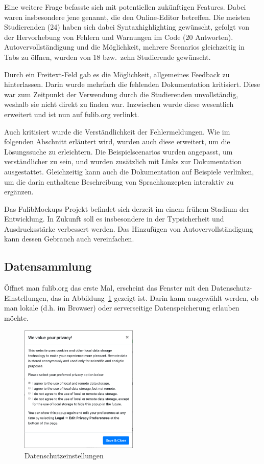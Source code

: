 Eine weitere Frage befasste sich mit potentiellen zukünftigen Features.
Dabei waren insbesondere jene genannt, die den Online-Editor betreffen.
Die meisten Studierenden (24) haben sich dabei Syntaxhighlighting gewünscht,
gefolgt von der Hervorhebung von Fehlern und Warnungen im Code (20 Antworten).
Autovervollständigung und die Möglichkeit, mehrere Scenarios gleichzeitig in Tabs zu öffnen,
wurden von 18 bzw.\ zehn Studierende gewünscht.

Durch ein Freitext-Feld gab es die Möglichkeit, allgemeines Feedback zu hinterlassen.
Darin wurde mehrfach die fehlenden Dokumentation kritisiert.
Diese war zum Zeitpunkt der Verwendung durch die Studierenden unvollständig,
weshalb sie nicht direkt zu finden war.
Inzwischen wurde diese wesentlich erweitert und ist nun auf fulib.org verlinkt.

Auch kritisiert wurde die Verständlichkeit der Fehlermeldungen.
Wie im folgenden Abschnitt erläutert wird,
wurden auch diese erweitert, um die Lösungssuche zu erleichtern.
Die Beispielscenarios wurden angepasst, um verständlicher zu sein,
und wurden zusätzlich mit Links zur Dokumentation ausgestattet.
Gleichzeitig kann auch die Dokumentation auf Beispiele verlinken,
um die darin enthaltene Beschreibung von Sprachkonzepten interaktiv zu ergänzen.

Das FulibMockups-Projekt befindet sich derzeit im einem frühem Stadium der Entwicklung.
In Zukunft soll es insbesondere in der Typsicherheit und Ausdrucksstärke verbessert werden.
Das Hinzufügen von Autovervollständigung kann dessen Gebrauch auch vereinfachen.

\subsection{Datensammlung}\label{subsec:data-collection}

Öffnet man fulib.org das erste Mal, erscheint das Fenster mit den Datenschutz-Einstellungen, das in Abbildung~\ref{fig:privacy} gezeigt ist.
Darin kann ausgewählt werden, ob man lokale (d.h. im Browser) oder serverseitige Datenspeicherung erlauben möchte.

\begin{figure}
    \centering
    \includegraphics[width=0.5\textwidth]{chapter/fulib.org/img/privacy.png}
    \caption{Datenschutzeinstellungen}
    \label{fig:privacy}
\end{figure}


